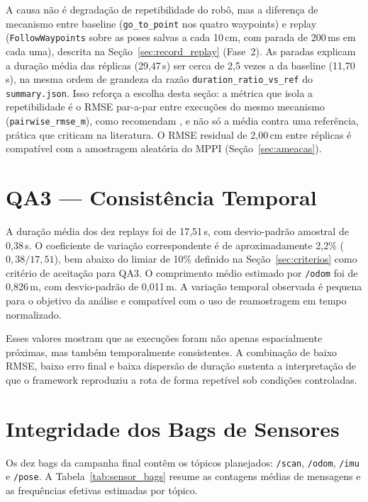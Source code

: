 A causa não é degradação de repetibilidade do robô, mas a diferença de
mecanismo entre baseline (\texttt{go\_\allowbreak to\_\allowbreak point} nos quatro
waypoints) e replay (\texttt{FollowWaypoints} sobre as poses salvas a cada
10\,cm, com parada de 200\,ms em cada uma), descrita na
Seção~\ref{sec:record_replay} (Fase~2). As paradas explicam a duração média das
réplicas (29,47\,s) ser cerca de 2,5 vezes a da baseline (11,70\,s), na mesma
ordem de grandeza da razão \texttt{duration\_\allowbreak ratio\_\allowbreak vs\_\allowbreak ref}
do \texttt{summary.json}. Isso reforça a escolha desta seção: a métrica que
isola a repetibilidade é o RMSE par-a-par entre execuções do mesmo mecanismo
(\texttt{pairwise\_\allowbreak rmse\_\allowbreak m}), como recomendam
, e não só a média contra uma referência, prática que
 criticam na literatura. O RMSE residual de 2,00\,cm
entre réplicas é compatível com a amostragem aleatória do MPPI
\cite{williams2016} (Seção~\ref{sec:ameacas}).

\section{QA3 --- Consistência Temporal}
\label{sec:res_qa3}

A duração média dos dez replays foi de 17,51\,s, com desvio-padrão amostral de
0,38\,s. O coeficiente de variação correspondente é de aproximadamente
2,2\% ($0,38/17,51$), bem abaixo do limiar de 10\% definido na
Seção~\ref{sec:criterios} como critério de aceitação para QA3. O comprimento
médio estimado por \texttt{/\allowbreak odom} foi de 0,826\,m, com
desvio-padrão de 0,011\,m. A variação temporal observada é pequena para o
objetivo da análise e compatível com o uso de reamostragem em tempo
normalizado.

Esses valores mostram que as execuções foram não apenas espacialmente próximas,
mas também temporalmente consistentes. A combinação de baixo RMSE, baixo erro
final e baixa dispersão de duração sustenta a interpretação de que o framework
reproduziu a rota de forma repetível sob condições controladas.

\section{Integridade dos Bags de Sensores}
\label{sec:res_bags}

Os dez bags da campanha final contêm os tópicos planejados:
\texttt{/\allowbreak scan}, \texttt{/\allowbreak odom}, \texttt{/\allowbreak imu}
e \texttt{/\allowbreak pose}. A Tabela~\ref{tab:sensor_bags} resume as
contagens médias de mensagens e as frequências efetivas estimadas por tópico.

